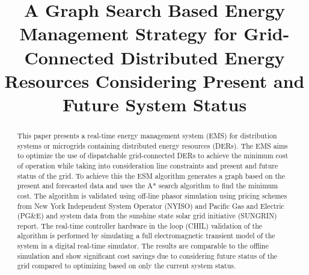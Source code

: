 \documentclass[journal]{IEEEtran}
\begin{document}
\title{A Graph Search Based Energy Management Strategy for Grid-Connected Distributed Energy Resources Considering Present and Future System Status}

\author{
}


\maketitle
\IEEEpeerreviewmaketitle

\begin{abstract}
This paper presents a real-time  energy management system (EMS) for distribution systems or microgrids containing distributed energy resources (DERs). The EMS aims to optimize the use of dispatchable grid-connected DERs to achieve the minimum cost of operation while taking into consideration line constraints and present and future status of the grid. To achieve this the ESM algorithm generates a graph based on the present and forecasted data and uses the A* search algorithm to find the minimum cost. The algorithm is validated using off-line phasor simulation using pricing schemes from New York Independent System Operator (NYISO) and Pacific Gas and Electric (PG\&E) and system data from the sunshine state solar grid initiative (SUNGRIN) report. The real-time controller hardware in the loop (CHIL) validation of the algorithm is performed by simulating a full electromagnetic transient model of the system in a digital real-time simulator. The results are comparable to the offline simulation and show significant cost savings due to considering future status of the grid compared to optimizing based on only the current system status.

\end{abstract}


















\end{document}
